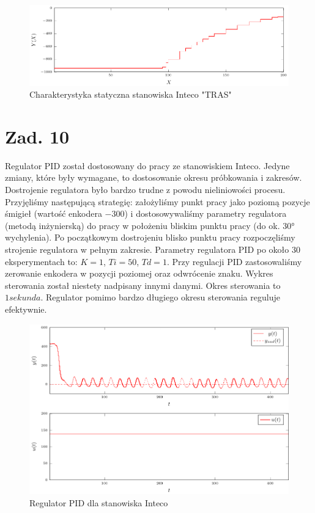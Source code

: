 \documentclass[a4paper,titlepage,11pt,twosides,floatssmall]{mwrep}
\begin{document}
\begin{figure}[]
	\centering
	\includegraphics[scale=1]{../wykresy/zad9_chst.pdf}
	\caption{Charakterystyka statyczna stanowiska Inteco "TRAS"}
	\label{zad9_chst}
\end{figure}


\endgroup

\chapter{Zad. 10}

Regulator PID został dostosowany do pracy ze stanowiskiem Inteco. Jedyne zmiany, które były wymagane, to dostosowanie okresu próbkowania i zakresów. Dostrojenie regulatora było bardzo trudne z powodu nieliniowości procesu. Przyjęliśmy następującą strategię: założyliśmy punkt pracy jako poziomą pozycje śmigieł (wartość enkodera $-300$) i dostosowywaliśmy parametry regulatora (metodą inżynierską) do pracy w położeniu bliskim punktu pracy (do ok. 30° wychylenia). Po początkowym dostrojeniu blisko punktu pracy rozpoczęliśmy strojenie regulatora w pełnym zakresie. Parametry regulatora PID po około $30$ eksperymentach to: $K = 1$, $Ti = 50$, $Td = 1$. Przy regulacji PID zastosowaliśmy zerowanie enkodera w pozycji poziomej oraz odwrócenie znaku. Wykres sterowania został niestety nadpisany innymi danymi. Okres sterowania to $1 sekunda$. Regulator pomimo bardzo długiego okresu sterowania reguluje efektywnie. 

\begin{figure}[]
	\centering
	\includegraphics[scale=1]{../wykresy/zad10_pid.pdf}
	\caption{Regulator PID dla stanowiska Inteco}
	\label{zad10_pid}
\end{figure}
\end{document}
